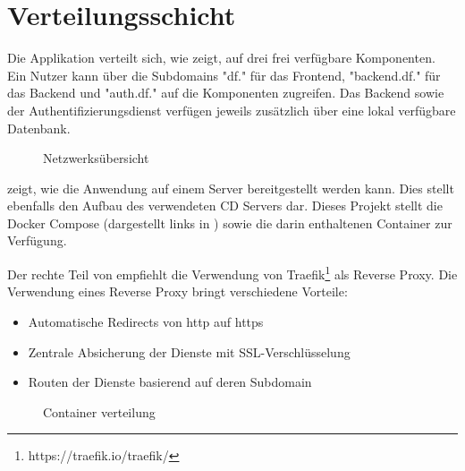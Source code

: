 \section{Verteilungsschicht}\label{sec:verteilungsschicht}
Die Applikation verteilt sich, wie  zeigt, auf drei frei verfügbare Komponenten.
Ein Nutzer kann über die Subdomains "df." für das Frontend, "backend.df." für das Backend und "auth.df."
auf die Komponenten zugreifen.
Das Backend sowie der Authentifizierungsdienst verfügen jeweils zusätzlich über eine lokal verfügbare Datenbank.

\begin{figure}[h]
    \centering
    
    \caption{Netzwerksübersicht}\label{fig:Netzwerksuebersicht}
\end{figure}

\newpage
{} zeigt, wie die Anwendung auf einem Server bereitgestellt werden kann.
Dies stellt ebenfalls den Aufbau des verwendeten \ac{CD} Servers dar.
Dieses Projekt stellt die Docker Compose (dargestellt links in )
sowie die darin enthaltenen Container zur Verfügung.

Der rechte Teil von  empfiehlt die Verwendung von Traefik\footnote{https://traefik.io/traefik/}
als Reverse Proxy.
Die Verwendung eines Reverse Proxy bringt verschiedene Vorteile:
\begin{itemize}
    \item Automatische Redirects von http auf https
    \item Zentrale Absicherung der Dienste mit \ac{SSL}-Verschlüsselung
    \item Routen der Dienste basierend auf deren Subdomain
\end{itemize}

\begin{figure}[h]
    \centering
    
    \caption{Container verteilung}\label{fig:Container-verteilung}
\end{figure}